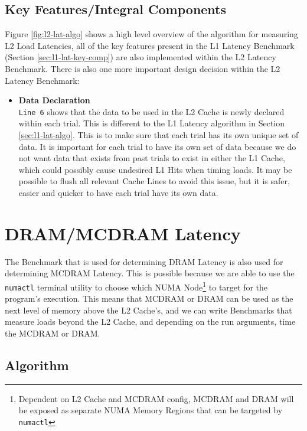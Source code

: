 \documentclass[bsc,frontabs,twoside,singlespacing,parskip,deptreport]{infthesis}     %
\begin{document}
\subsection{Key Features/Integral Components}\label{sec:l2-lat-key-comp}
Figure \ref{fig:l2-lat-algo} shows a high level overview of the algorithm for measuring L2 Load Latencies, all of the key features present in the L1 Latency Benchmark (Section \ref{sec:l1-lat-key-comp}) are also implemented within the L2 Latency Benchmark. There is also one more important design decision within the L2 Latency Benchmark:
\begin{itemize}
    \item{{\bf Data Declaration} \\
    \texttt{Line 6} shows that the data to be used in the L2 Cache is newly declared within each trial. This is different to the L1 Latency algorithm in Section \ref{sec:l1-lat-algo}. This is to make sure that each trial has its own unique set of data. It is important for each trial to have its own set of data because we do not want data that exists from past trials to exist in either the L1 Cache, which could possibly cause undesired L1 Hits when timing loads. It may be possible to flush all relevant Cache Lines to avoid this issue, but it is safer, easier and quicker to have each trial have its own data.
    }\label{data-declaration-consideration-L2}
\end{itemize}


\newpage

\section{DRAM/MCDRAM Latency}\label{mcdram-dram-benchmarks-lat}
The Benchmark that is used for determining DRAM Latency is also used for determining MCDRAM Latency. This is possible because we are able to use the \texttt{numactl}\cite{numactl_man} terminal utility to choose which NUMA Node\footnote{Dependent on L2 Cache and MCDRAM config, MCDRAM and DRAM will be exposed as separate NUMA Memory Regions that can be targeted by \texttt{numactl}} to target for the program's execution. This means that MCDRAM or DRAM can be used as the next level of memory above the L2 Cache's, and we can write Benchmarks that measure loads beyond the L2 Cache, and depending on the run arguments, time the MCDRAM or DRAM.
\subsection{Algorithm}
\end{document}
